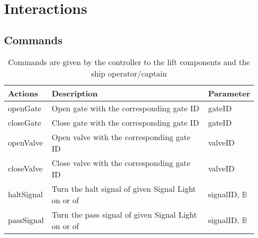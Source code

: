 \section{Interactions}

\subsection{Commands}
\begin{table}[htbp]
	\centering
	\caption{Commands are given by the controller to the lift components and the ship operator/captain}
	\begin{tabular}{lll}
		\toprule
		\textbf{Actions} & \textbf{Description} & \textbf{Parameter} \\
		\midrule
		openGate & Open gate with the corresponding gate ID & gateID \\
		closeGate & Close gate with the corresponding gate ID & gateID \\
		openValve & Open valve with the corresponding gate ID & valveID \\
		closeValve & Close valve with the corresponding gate ID & valveID \\
		haltSignal & Turn the halt signal of given Signal Light on or of & signalID, $\mathbb{B}$\\
		passSignal & Turn the pass signal of given Signal Light on or of & signalID, $\mathbb{B}$\\

\bottomrule
\end{tabular}%
\label{tab:addlabel}%
\end{table}%
		
		
		


		
